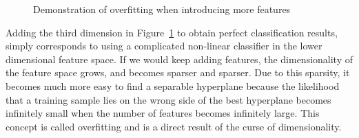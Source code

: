 \documentclass[11pt]{article}
\begin{document}
\begin{figure}[H]
    \centering
    \caption{Demonstration of overfitting when introducing more features~\cite{visiondummyCurseDimensionality}}\label{fig:more-features-overfitting}
\end{figure}

Adding the third dimension in Figure~\ref{fig:more-features-overfitting} to obtain perfect classification results, simply corresponds to using a complicated non-linear classifier in the lower dimensional feature space. If we would keep adding features, the dimensionality of the feature space grows, and becomes sparser and sparser. Due to this sparsity, it becomes much more easy to find a separable hyperplane because the likelihood that a training sample lies on the wrong side of the best hyperplane becomes infinitely small when the number of features becomes infinitely large. This concept is called overfitting and is a direct result of the curse of dimensionality.
\end{document}
